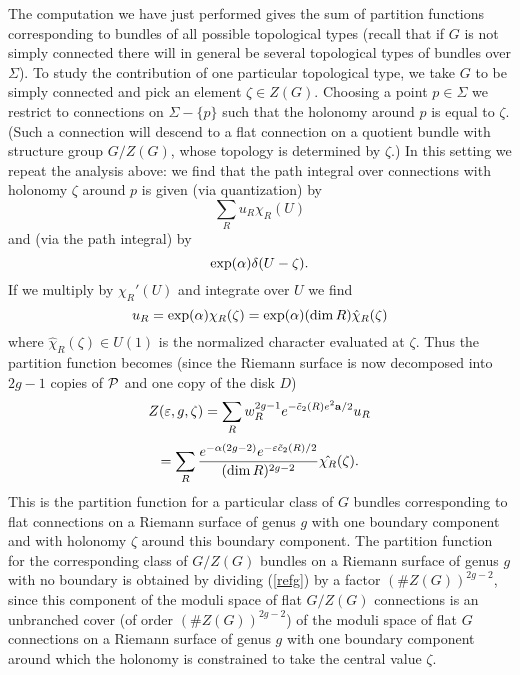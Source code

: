 \documentclass[12pt]{article}
\begin{document}
The computation we have just performed gives the sum of partition 
functions corresponding to bundles of all possible topological 
types (recall that if $G$ is not simply connected there will in general
be several topological types of bundles over $\Sigma$).
To study the contribution of one particular topological type, 
we take $G$ to be simply connected and pick an element
$\zeta \in Z(G)$.
Choosing a point $ p \in \Sigma$ we restrict to connections on 
$\Sigma - \{ p \}$ such that the holonomy around $p$ is
equal to $\zeta$. (Such a connection will descend to a flat
connection on a  quotient bundle with structure group 
$G/Z(G)$, whose topology is determined by 
$\zeta$.) In this setting we repeat the analysis above: we find that
the path integral over connections with holonomy $\zeta$ around 
$p$ is given (via quantization) by 
\begin{equation}
\sum_R u_R \chi_R (U) 
\end{equation}
and (via the path integral) by 
\begin{equation}
\exp (\alpha) \delta (U - \zeta).
\end{equation}
 If we multiply by
$\chi_R'(U)$ and integrate over $U$ we find
\begin{equation}
u_R = \exp(\alpha) \chi_R(\zeta) = \exp 
(\alpha) (\dim R) \hat{\chi}_R(\zeta) 
\end{equation}
where $\hat{\chi}_R (\zeta) \in U(1)$ is the 
normalized character evaluated at $\zeta$. 
Thus the partition function becomes (since the Riemann surface
is now decomposed into $2g-1$ copies of $\cal P$ and
one copy of the disk $D$)
\begin{equation}
Z(\varepsilon, g, \zeta) = 
\sum_R w_R^{2g-1} e^{ - \tilde{c}_2(R) e^2 {\bf a}/2} 
u_R
\end{equation} 
\begin{equation} \labell{refg} 
 = \sum_R 
\frac{ e^{ - \eulconst (2g-2)}
 e^{ - \varepsilon \tilde{c}_2(R)/2 } }
{(\dim R)^{2g-2} } \hat{\chi_R} (\zeta). 
\end{equation}
This is the partition function for a particular class of 
$G$ bundles corresponding to flat connections
on a Riemann surface of genus 
$g$ with one boundary component and  with holonomy
$\zeta$ around this boundary component.  The
 partition function for the corresponding class of 
$G/Z(G)$ bundles on a Riemann surface of genus $g$ with 
no boundary is obtained by dividing  (\ref{refg}) by 
a factor $(\#Z(G))^{2g-2}$, since this component of the
 moduli space of flat
$G/Z(G)$ connections is an unbranched cover (of order
$(\#Z(G))^{2g-2}$)
 of the moduli space of
flat $G$ connections on a Riemann surface of genus $g$ with one
boundary component around which the holonomy is constrained to take
the central value $\zeta$.
\end{document}
